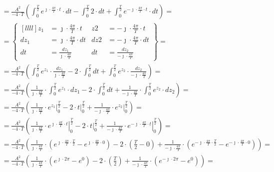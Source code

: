 \begin{task}
\begin{align*}
&=\frac{A^2}{-4 \cdot T} \left(  
\int_{0}^{\frac{T}{2}} e^{\jmath \cdot \frac{4\pi}{T} \cdot t} \cdot dt - \int_{0}^{\frac{T}{2}} 2 \cdot dt + \int_{0}^{\frac{T}{2}} e^{-\jmath \cdot \frac{4\pi}{T} \cdot t} \cdot dt \right)=\\
&=\begin{Bmatrix*}[llll]
z_1&=\jmath \cdot \frac{4\pi}{T} \cdot t & z2&=-\jmath \cdot \frac{4\pi}{T} \cdot t\\
dz_1&=\jmath \cdot \frac{4\pi}{T} \cdot dt & dz2&=-\jmath \cdot \frac{4\pi}{T} \cdot dt\\
dt&=\frac{dz_1}{\jmath \cdot \frac{4\pi}{T}} & dt&=\frac{dz_2}{-\jmath \cdot \frac{4\pi}{T}}
\end{Bmatrix*}=\\
&=\frac{A^2}{-4 \cdot T} \left(  
\int_{0}^{\frac{T}{2}} e^{z_1} \cdot \frac{dz_1}{\jmath \cdot \frac{4\pi}{T}} -  2 \cdot \int_{0}^{\frac{T}{2}} dt + \int_{0}^{\frac{T}{2}} e^{z_2} \cdot \frac{dz_2}{-\jmath \cdot \frac{4\pi}{T}} \right)=\\
&=\frac{A^2}{-4 \cdot T} \left( \frac{1}{\jmath \cdot \frac{4\pi}{T}} \cdot 
\int_{0}^{\frac{T}{2}} e^{z_1} \cdot dz_1 -  2 \cdot \int_{0}^{\frac{T}{2}} dt + \frac{1}{-\jmath \cdot \frac{4\pi}{T}} \cdot \int_{0}^{\frac{T}{2}} e^{z_2} \cdot dz_2 \right)=\\
&=\frac{A^2}{-4 \cdot T} \left( \frac{1}{\jmath \cdot \frac{4\pi}{T}} \cdot 
\left. e^{z_1} \right|_{0}^{\frac{T}{2}} -  2 \cdot \left. t \right|_{0}^{\frac{T}{2}} + \frac{1}{-\jmath \cdot \frac{4\pi}{T}} \cdot \left. e^{z_2} \right|_{0}^{\frac{T}{2}} \right)=\\
&=\frac{A^2}{-4 \cdot T} \left( \frac{1}{\jmath \cdot \frac{4\pi}{T}} \cdot 
\left. e^{\jmath \cdot \frac{4\pi}{T} \cdot t} \right|_{0}^{\frac{T}{2}} -  2 \cdot \left. t \right|_{0}^{\frac{T}{2}} + \frac{1}{-\jmath \cdot \frac{4\pi}{T}} \cdot \left. e^{-\jmath \cdot \frac{4\pi}{T} \cdot t} \right|_{0}^{\frac{T}{2}} \right)=\\
&=\frac{A^2}{-4 \cdot T} \left( \frac{1}{\jmath \cdot \frac{4\pi}{T}} \cdot 
\left( e^{\jmath \cdot \frac{4\pi}{T} \cdot \frac{T}{2}} - e^{\jmath \cdot \frac{4\pi}{T} \cdot 0} \right) -  2 \cdot \left(\frac{T}{2} - 0 \right) + \frac{1}{-\jmath \cdot \frac{4\pi}{T}} \cdot \left( e^{-\jmath \cdot \frac{4\pi}{T} \cdot \frac{T}{2}} - e^{-\jmath \cdot \frac{4\pi}{T} \cdot 0} \right) \right)=\\
&=\frac{A^2}{-4 \cdot T} \left( \frac{1}{\jmath \cdot \frac{4\pi}{T}} \cdot 
\left( e^{\jmath \cdot 2\pi} - e^{0} \right) -  2 \cdot \left(\frac{T}{2}\right) + \frac{1}{-\jmath \cdot \frac{4\pi}{T}} \cdot \left( e^{-\jmath \cdot 2\pi} - e^{0} \right) \right)=\\

\end{align*}
\end{task}
